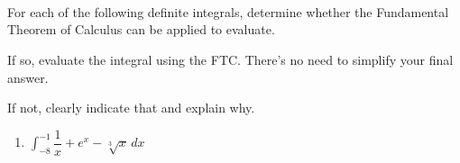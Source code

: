 \documentclass[10pt]{article}
\begin{document}
{\begin{solution}
\par\noindent\hrulefill \\
\par\noindent\hrulefill \\
\par\noindent\hrulefill \\
\par\noindent\hrulefill 
\end{solution}
\newpage

\item {}For each of the following definite integrals, determine whether the Fundamental Theorem of Calculus can be applied to evaluate. 

If so, evaluate the integral using the FTC. There's no need to simplify your final answer.

If not, clearly indicate that and explain why.

\begin{enumerate}
    \item $\displaystyle\int_{-8}^{-1}\dfrac{1}{x}+e^x-\sqrt[3]{x}\, dx$


\end{enumerate}}
\end{document}

